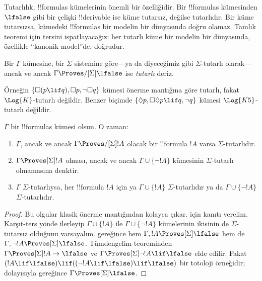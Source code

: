 \documentclass[../../../include/open-logic-section]{subfiles}
\begin{document}


Tutarlılık, !!{formula}s kümelerinin önemli bir özelliğidir. Bir !!{formula}s
kümesinden $\lfalse$ gibi bir çelişki !!{derivable} ise küme tutarsız,
değilse tutarlıdır. Bir küme tutarsızsa, kümedeki !!{formula}s bir modelin
bir dünyasında doğru olamaz. Tamlık teoremi için tersini ispatlayacağız: her
tutarlı küme bir modelin bir dünyasında, özellikle ``kanonik model''de,
doğrudur.

\begin{defn}
  Bir $\Gamma$ kümesine, bir $\Sigma$ sistemine göre---ya da diyeceğimiz
  gibi $\Sigma$-tutarlı olarak---ancak ve ancak
  $\Gamma\Proves/[\Sigma]\lfalse$ ise \emph{tutarlı} deriz.
\end{defn}

Örneğin $\{\Box(p\lif q),\Box p,\lnot\Box q\}$ kümesi önerme mantığına
göre tutarlı, fakat $\Log{K}$-tutarlı değildir. Benzer biçimde
$\{\Diamond p,\Box\Diamond p\lif q,\lnot q\}$ kümesi
$\Log{K5}$-tutarlı değildir.

\begin{prop}
  $\Gamma$ bir !!{formula}s kümesi olsun. O zaman:
  \begin{enumerate}
  \item $\Gamma$, ancak ve ancak $\Gamma\Proves/[\Sigma]!A$ olacak bir
    !!{formula} $!A$ varsa $\Sigma$-tutarlıdır.
  \item {}%
    $\Gamma\Proves[\Sigma]!A$ olması, ancak ve ancak
    $\Gamma\cup\{\lnot!A\}$ kümesinin $\Sigma$-tutarlı olmamasına denktir.
  \item {}%
    $\Gamma$ $\Sigma$-tutarlıysa, her !!{formula} $!A$ için ya
    $\Gamma\cup\{!A\}$ $\Sigma$-tutarlıdır ya da
    $\Gamma\cup\{\lnot!A\}$ $\Sigma$-tutarlıdır.
  \end{enumerate}
\end{prop}

\begin{proof}
  Bu olgular klasik önerme mantığından kolayca çıkar.
   için kanıtı verelim. Karşıt-ters yönde
  ilerleyip $\Gamma\cup\{!A\}$ ile
  $\Gamma\cup\{\lnot!A\}$ kümelerinin ikisinin de $\Sigma$-tutarsız
  olduğunu varsayalım.
   gereğince hem
  $\Gamma,!A\Proves[\Sigma]\lfalse$ hem de
  $\Gamma,\lnot!A\Proves[\Sigma]\lfalse$. Tümdengelim teoreminden
  $\Gamma\Proves[\Sigma]!A\to\lfalse$ ve
  $\Gamma\Proves[\Sigma]\lnot!A\lif\lfalse$ elde edilir. Fakat
  $(!A\lif\lfalse)\lif((\lnot!A\lif\lfalse)\lif\lfalse)$ bir totoloji
  örneğidir; dolayısıyla
  gereğince $\Gamma\Proves[\Sigma]\lfalse$.
\end{proof}
\end{document}
